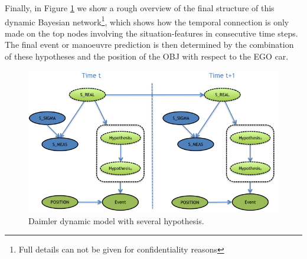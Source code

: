 Finally, in Figure \ref{Figure:daimlerLEdynGeneric} we show a rough overview of the final structure of this dynamic Bayesian network\footnote{Full details can not be given for confidentiality reasons}, which shows how the temporal connection is only made on the top nodes involving the situation-features in consecutive time steps.  The final event or manoeuvre prediction is then determined by the combination of these hypotheses and the position of the OBJ with respect to the EGO car.

\begin{figure}
\begin{center}
\includegraphics[scale=0.58]{./figures/DaimlerLEdynGeneric}
\end{center}
\caption{\label{Figure:daimlerLEdynGeneric}Daimler dynamic model with several hypothesis.}
\end{figure}





